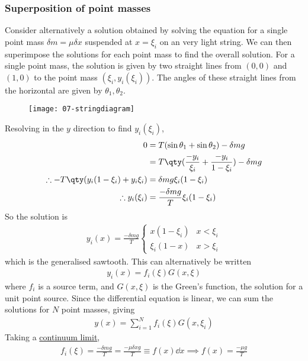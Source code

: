 \subsubsection{Superposition of point masses}
Consider alternatively a solution obtained by solving the equation for a single point mass $\delta m = \mu \delta x$ suspended at $x = \xi_i$ on an very light string.
We can then superimpose the solutions for each point mass to find the overall solution.
For a single point mass, the solution is given by two straight lines from $(0,0)$ and $(1,0)$ to the point mass $(\xi_i, y_i(\xi_i))$.
The angles of these straight lines from the horizontal are given by $\theta_1, \theta_2$.
\begin{figure}[h] 
    \centering 
    \texttt{[image: 07-stringdiagram]} 
\end{figure}
Resolving in the $y$ direction to find $y_i(\xi_i)$,
\begin{align*}
	0 & = T (\sin \theta_1 + \sin \theta_2) - \delta m g \\
	& = T\qty(\frac{-y_i}{\xi_i} + \frac{-y_i}{1-\xi_i}) - \delta m g \\
	\therefore -T\qty(y_i(1-\xi_i) + y_i \xi_i) & = \delta m g \xi_i(1-\xi_i) \\
	\therefore y_i(\xi_i) & = \frac{-\delta m g}{T} \xi_i (1-\xi_i)
\end{align*}
So the solution is
\begin{align*}
	y_i(x) = \frac{-\delta m g}{T} \begin{cases}
		x(1-\xi_i)    & x < \xi_i \\
		\xi_i (1 - x) & x > \xi_i
	\end{cases}
\end{align*}
which is the generalised sawtooth.
This can alternatively be written
\begin{align*}
	y_i(x) = f_i(\xi) G(x,\xi)
\end{align*}
where $f_i$ is a source term, and $G(x,\xi)$ is the Green's function, the solution for a unit point source.
Since the differential equation is linear, we can sum the solutions for $N$ point masses, giving
\begin{align*}
	y(x) = \sum_{i=1}^N f_i(\xi) G(x, \xi_i)
\end{align*}
Taking a \underline{continuum limit},
\begin{align*}
	f_i(\xi) = \frac{-\delta m g}{T} = \frac{-\mu \delta x g}{T} \equiv f(x) \dd{x} \implies f(x) = \frac{-\mu g}{T}
\end{align*}
